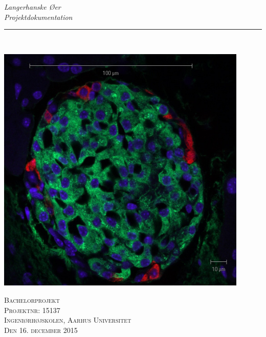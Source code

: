 \thispagestyle{empty}
\begin{flushright}
\vspace{3cm}

\phantom{hul}

\phantom{hul}

\phantom{hul}

\textsl{\Huge Langerhanske Øer} \\ \vspace{1cm}
\textsl{\Huge Projektdokumentation} \\ \vspace{1cm}

\rule{13cm}{3mm} \\ \vspace{1.5cm}

\includegraphics[width=0.9\textwidth]{billeder/forside.jpg}

\textsc{\Large Bachelorprojekt \\
Projektnr: 15137 \\
Ingeniørhøjskolen, Aarhus Universitet \\
Den 16. december 2015 \\}
\end{flushright}

